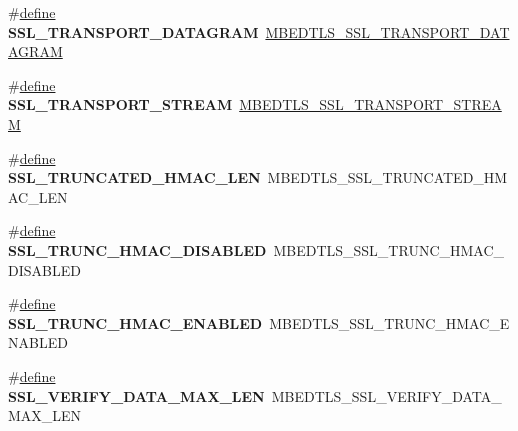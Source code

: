 \begin{DoxyCompactItemize}
\item 
\mbox{\label{compat-1_83_8h_a8c427b76b224393c29423a318dbd9997}} 
\#\hyperlink{structdefine}{define} {\bfseries S\+S\+L\+\_\+\+T\+R\+A\+N\+S\+P\+O\+R\+T\+\_\+\+D\+A\+T\+A\+G\+R\+AM}~\hyperlink{ssl_8h_ac00527bc4661e5d7f2df5e7e96a6a896}{M\+B\+E\+D\+T\+L\+S\+\_\+\+S\+S\+L\+\_\+\+T\+R\+A\+N\+S\+P\+O\+R\+T\+\_\+\+D\+A\+T\+A\+G\+R\+AM}
\item 
\mbox{\label{compat-1_83_8h_a14291ec8216dfd0e6d6ce2b9fcbd5a8f}} 
\#\hyperlink{structdefine}{define} {\bfseries S\+S\+L\+\_\+\+T\+R\+A\+N\+S\+P\+O\+R\+T\+\_\+\+S\+T\+R\+E\+AM}~\hyperlink{ssl_8h_acf690cf4772ff3e2df4b8295275e6fc7}{M\+B\+E\+D\+T\+L\+S\+\_\+\+S\+S\+L\+\_\+\+T\+R\+A\+N\+S\+P\+O\+R\+T\+\_\+\+S\+T\+R\+E\+AM}
\item 
\mbox{\label{compat-1_83_8h_a36c288429758bd90fbfa891089d984ff}} 
\#\hyperlink{structdefine}{define} {\bfseries S\+S\+L\+\_\+\+T\+R\+U\+N\+C\+A\+T\+E\+D\+\_\+\+H\+M\+A\+C\+\_\+\+L\+EN}~M\+B\+E\+D\+T\+L\+S\+\_\+\+S\+S\+L\+\_\+\+T\+R\+U\+N\+C\+A\+T\+E\+D\+\_\+\+H\+M\+A\+C\+\_\+\+L\+EN
\item 
\mbox{\label{compat-1_83_8h_a3fc505cdd77f24a0b3b509376abae77f}} 
\#\hyperlink{structdefine}{define} {\bfseries S\+S\+L\+\_\+\+T\+R\+U\+N\+C\+\_\+\+H\+M\+A\+C\+\_\+\+D\+I\+S\+A\+B\+L\+ED}~M\+B\+E\+D\+T\+L\+S\+\_\+\+S\+S\+L\+\_\+\+T\+R\+U\+N\+C\+\_\+\+H\+M\+A\+C\+\_\+\+D\+I\+S\+A\+B\+L\+ED
\item 
\mbox{\label{compat-1_83_8h_a8f0eeff6804fb62e9eed7fc94f751efe}} 
\#\hyperlink{structdefine}{define} {\bfseries S\+S\+L\+\_\+\+T\+R\+U\+N\+C\+\_\+\+H\+M\+A\+C\+\_\+\+E\+N\+A\+B\+L\+ED}~M\+B\+E\+D\+T\+L\+S\+\_\+\+S\+S\+L\+\_\+\+T\+R\+U\+N\+C\+\_\+\+H\+M\+A\+C\+\_\+\+E\+N\+A\+B\+L\+ED
\item 
\mbox{\label{compat-1_83_8h_ab5e0465928755ad79990548cbc688c41}} 
\#\hyperlink{structdefine}{define} {\bfseries S\+S\+L\+\_\+\+V\+E\+R\+I\+F\+Y\+\_\+\+D\+A\+T\+A\+\_\+\+M\+A\+X\+\_\+\+L\+EN}~M\+B\+E\+D\+T\+L\+S\+\_\+\+S\+S\+L\+\_\+\+V\+E\+R\+I\+F\+Y\+\_\+\+D\+A\+T\+A\+\_\+\+M\+A\+X\+\_\+\+L\+EN
\item 
\mbox{\label{compat-1_83_8h_a060b51dc564d4b9dc941e81eab66d60c}} 

\end{DoxyCompactItemize}
